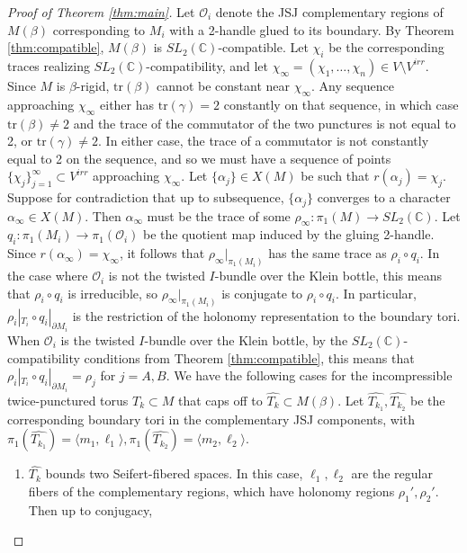 \documentclass{article}
\theoremstyle{plain}
\theoremstyle{definition}
\theoremstyle{plain}
\theoremstyle{plain}
\theoremstyle{plain}
\theoremstyle{remark}
\theoremstyle{remark}
\theoremstyle{plain}
\theoremstyle{plain}
\begin{document}
\begin{proof}[Proof of Theorem \ref{thm:main}]
	Let $\mathcal{O}_i$ denote the JSJ complementary regions of $M(\beta)$ corresponding to $M_i$ with a 2-handle glued to its boundary. By Theorem \ref{thm:compatible}, $M(\beta)$ is $SL_2(\mathbb{C})$-compatible. Let $\chi_i$ be the corresponding traces realizing $SL_2(\mathbb{C})$-compatibility, and let $\chi_\infty = (\chi_1, \dots, \chi_n) \in V \setminus V^{irr}$. Since $M$ is $\beta$-rigid, $\text{tr}(\beta)$ cannot be constant near $\chi_\infty$. Any sequence approaching $\chi_\infty$ either has $\text{tr}(\gamma) = 2$ constantly on that sequence, in which case $\text{tr}(\beta) \neq 2$ and the trace of the commutator of the two punctures is not equal to 2, or $\text{tr}(\gamma) \neq 2$. In either case, the trace of a commutator is not constantly equal to 2 on the sequence, and so we must have a sequence of points $\{\chi_j\}_{j=1}^\infty \subset V^{irr}$ approaching $\chi_\infty$. Let $\{\alpha_j\} \in X(M)$ be such that $r(\alpha_j) = \chi_j$. Suppose for contradiction that up to subsequence, $\{\alpha_j\}$ converges to a character $\alpha_\infty \in X(M)$. Then $\alpha_\infty$ must be the trace of some $\rho_\infty: \pi_1(M) \to SL_2(\mathbb{C})$. Let $q_i: \pi_1(M_i) \to \pi_1(\mathcal{O}_i)$ be the quotient map induced by the gluing 2-handle. Since $r(\alpha_\infty) = \chi_\infty$, it follows that $\rho_\infty|_{\pi_1(M_i)}$ has the same trace as $\rho_i \circ q_i$. In the case where $\mathcal{O}_i$ is not the twisted $I$-bundle over the Klein bottle, this means that $\rho_i \circ q_i$ is irreducible, so $\rho_\infty|_{\pi_1(M_i)}$ is conjugate to $\rho_i \circ q_i$. In particular, $\rho_i|_{T_i} \circ q_i|_{\partial M_i}$ is the restriction of the holonomy representation to the boundary tori. When $\mathcal{O}_i$ is the twisted $I$-bundle over the Klein bottle, by the $SL_2(\mathbb{C})$-compatibility conditions from Theorem \ref{thm:compatible}, this means that $\rho_i|_{T_i} \circ q_i|_{\partial M_i} = \rho_j$ for $j = A, B$. We have the following cases for the incompressible twice-punctured torus $T_k \subset M$ that caps off to $\widehat{T_k} \subset M(\beta)$. Let $\widehat{T_{k_1}}, \widehat{T_{k_2}}$ be the corresponding boundary tori in the complementary JSJ components, with $\pi_1(\widehat{T_{k_1}}) = \langle m_1, \ell_1 \rangle, \pi_1(\widehat{T_{k_2}}) = \langle m_2, \ell_2 \rangle$.
	\begin{enumerate}
		\item $\widehat{T_k}$ bounds two Seifert-fibered spaces. In this case, $\ell_1, \ell_2$ are the regular fibers of the complementary regions, which have holonomy regions $\rho_1', \rho_2'$. Then up to conjugacy, 

\end{enumerate}
\end{proof}
\end{document}
